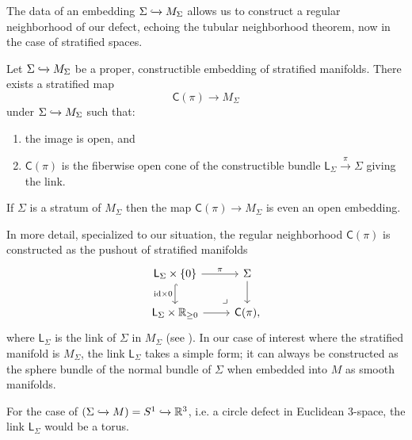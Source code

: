 \documentclass[../text]{subfiles}
\begin{document}
The data of an embedding $\Sigma \xhookrightarrow{} M_\Sigma$ allows us to construct a regular neighborhood of our defect, echoing the tubular neighborhood theorem, now in the case of stratified spaces.
%
\begin{theorem}
    Let $\Sigma \xhookrightarrow{} M_\Sigma$ be a proper, constructible embedding of stratified manifolds. There exists a stratified map
    \begin{equation}
        \mathsf{C}(\pi) \rightarrow M_\Sigma
    \end{equation}
    under $\Sigma \xhookrightarrow{} M_\Sigma$ such that:
    \begin{enumerate}
        \item the image is open, and
        \item $\mathsf{C}(\pi)$ is the fiberwise open cone of the constructible bundle $\mathsf{L}_{\Sigma} \xrightarrow{\pi} \Sigma$ giving the link.
    \end{enumerate}
    If $\Sigma$ is a stratum of $M_\Sigma$ then the map $\mathsf{C}(\pi) \rightarrow M_\Sigma$ is even an open embedding.
\end{theorem}

\begin{remark}
    In more detail, specialized to our situation, the regular neighborhood $\mathsf{C}(\pi)$ is constructed as the pushout of stratified manifolds
    \begin{equation}
        \begin{tikzcd}
            \mathsf{L}_{\Sigma} \times \{0\} \arrow[r, "\pi"] \arrow[d, "\mathrm{id} \times 0"', hook] & \Sigma \arrow[d] \\
            \mathsf{L}_{\Sigma} \times \hoint \arrow[r] & \mathsf{C}(\pi) \arrow[ul, phantom, "\lrcorner", very near start],
        \end{tikzcd}
    \end{equation}
    where $\mathsf{L}_{\Sigma}$ is the link of $\Sigma$ in $M_{\Sigma}$ (see \cite{aft_localstrut}). In our case of interest where the stratified manifold is $M_{\Sigma}$, the link $\mathsf{L}_{\Sigma}$ takes a simple form; it can always be constructed as the sphere bundle of the normal bundle of $\Sigma$ when embedded into $M$ as smooth manifolds.
\end{remark}

\begin{example}
    For the case of $(\Sigma \xhookrightarrow{} M) = {S^1 \xhookrightarrow{} \mathbb{R}^3}$, i.e. a circle defect in Euclidean 3-space, the link $\mathsf{L}_{\Sigma}$ would be a torus.
\end{example}
\end{document}
